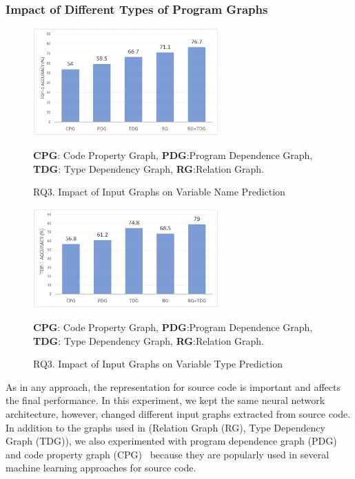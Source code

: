 \subsubsection{Impact of Different Types of Program Graphs}
\label{sec:graphs}

\begin{figure}[thbp]
\begin{center}
\includegraphics[width=2.8in]{figures/sensi-graphs-name}
\vspace{-8pt}
\caption{RQ3. Impact of Input Graphs on Variable Name Prediction}
\label{graph-name-result}
{\bf CPG}: Code Property Graph, {\bf PDG}:Program Dependence Graph, {\bf TDG}: Type Dependency Graph, {\bf RG}:Relation Graph. 
\end{center}
\end{figure}

\begin{figure}[thbp]
\begin{center}
\includegraphics[width=2.8in]{figures/sensi-graphs-type}
\vspace{-8pt}
\caption{RQ3. Impact of Input Graphs on Variable Type Prediction}
\label{graph-type-result}
{\bf CPG}: Code Property Graph, {\bf PDG}:Program Dependence Graph, {\bf TDG}: Type Dependency Graph, {\bf RG}:Relation Graph.
\end{center}
\end{figure}

As in any approach, the representation for source code is important
and affects the final performance. In this experiment, we kept the
same neural network architecture, however, changed different input
graphs extracted from source code. In addition to the graphs used in
{\tool} (Relation Graph (RG), Type Dependency Graph (TDG)), we also
experimented with program dependence graph (PDG) and code property
graph (CPG)~\cite{CPG-2014} because they are popularly used in several
machine learning approaches for source code.

